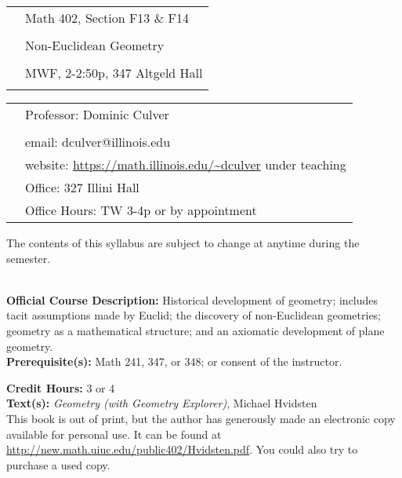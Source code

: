 \documentclass[11pt]{article}
\begin{document}
\begin{tabular}{ l l }
  \multirow{3}{*}{} & \LARGE Math 402, Section F13 \& F14 \\\\
  & \LARGE Non-Euclidean Geometry \\\\
  & \LARGE MWF, 2-2:50p, 347 Altgeld Hall\\\\
\end{tabular}
\vspace{10mm}

\begin{tabular}{ l l }
  \multirow{6}{*}{} & \large Professor: Dominic Culver \\\\
  & \large email: dculver@illinois.edu \\
  & \large website: \url{https://math.illinois.edu/~dculver} under teaching \\
  & \large Office: 327 Illini Hall \\
  & \large Office Hours: TW 3-4p or by appointment \\
\end{tabular}
\vspace{5mm}
\begin{center} The contents of this syllabus are subject to change at anytime during the semester. \\
\end{center}

\textbf {\large \\ Official Course Description:} Historical development of geometry; includes tacit assumptions made by Euclid; the discovery of non-Euclidean geometries; geometry as a mathematical structure; and an axiomatic development of plane geometry.\\
\textbf {Prerequisite(s):} Math 241, 347, or 348; or consent of the instructor.


\textbf {Credit Hours:} 3 or 4 \\

\textbf {\large Text(s):} \textit{Geometry (with Geometry Explorer)}, Michael Hvidsten\\
This book is out of print, but the author has generously made an electronic copy available for personal use. It can be found at \url{http://new.math.uiuc.edu/public402/Hvidsten.pdf}. You could also try to purchase a used copy.\\
\end{document}
